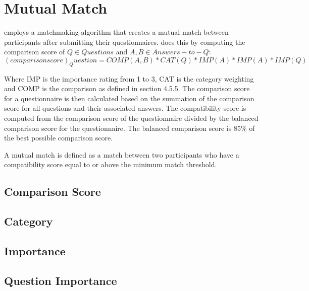 \section{Mutual Match}
\label{sec:matching}
\Friending{} employs a matchmaking algorithm that creates a mutual match between participants after submitting their questionnaires.  \Friending{} does this by computing the comparison score of $Q \in Questions$ and $A,B \in Answers-to-Q$:
\begin{equation}
(comparison score)_Question = COMP(A,B)*CAT(Q)*IMP(A)*IMP(A)*IMP(Q) 
\end{equation}

Where IMP is the importance rating from 1 to 3, CAT is the category weighting and COMP is the comparison as defined in section 4.5.5.   The comparison score for a questionnaire is then calculated based on the summation of the comparison score for all questions and their associated answers.
The compatibility score is computed from the comparison score of the questionnaire divided by the balanced comparison score for the questionnaire.  The balanced comparison score is $85\%$ of the best possible comparison score.

A mutual match is defined as a match between two participants who have a compatibility score equal to or above the minimum match threshold.  

\subsection{Comparison Score}
\label{sec:score_comp}

\subsection{Category}
\label{sec:score_cat}

\subsection{Importance}
\label{sec:score_imp}

\subsection{Question Importance}
\label{sec:scoreq_qimp}